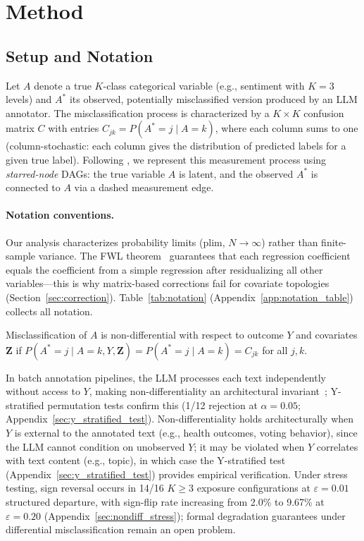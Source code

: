 \section{Method}
\label{sec:method}

\subsection{Setup and Notation}
\label{sec:notation}

Let $A$ denote a true $K$-class categorical variable (e.g., sentiment with $K{=}3$ levels) and $A^*$ its observed, potentially misclassified version produced by an LLM annotator. The misclassification process is characterized by a $K{\times}K$ confusion matrix $C$ with entries $C_{jk} = P(A^*{=}j \mid A{=}k)$, where each column sums to one (column-stochastic: each column gives the distribution of predicted labels for a given true label). Following \citet{hernan_cole2009}, we represent this measurement process using \emph{starred-node} DAGs: the true variable $A$ is latent, and the observed $A^*$ is connected to $A$ via a dashed measurement edge.

\paragraph{Notation conventions.}
Our analysis characterizes probability limits (plim, $N \to \infty$) rather than finite-sample variance. The FWL theorem~\cite{frisch1933partial} guarantees that each regression coefficient equals the coefficient from a simple regression after residualizing all other variables---this is why matrix-based corrections fail for covariate topologies (Section~\ref{sec:correction}). Table~\ref{tab:notation} (Appendix~\ref{app:notation_table}) collects all notation.

\begin{definition}
\label{def:nondiff}
Misclassification of $A$ is non-differential with respect to outcome $Y$ and covariates $\mathbf{Z}$ if $P(A^*{=}j \mid A{=}k, Y, \mathbf{Z}) = P(A^*{=}j \mid A{=}k) = C_{jk}$ for all $j,k$.
\end{definition}

In batch annotation pipelines, the LLM processes each text independently without access to $Y$, making non-differentiality an architectural invariant~\cite{ziems2024can}; Y-stratified permutation tests confirm this (1/12 rejection at $\alpha{=}0.05$; Appendix~\ref{sec:y_stratified_test}). Non-differentiality holds architecturally when $Y$ is external to the annotated text (e.g., health outcomes, voting behavior), since the LLM cannot condition on unobserved $Y$; it may be violated when $Y$ correlates with text content (e.g., topic), in which case the Y-stratified test (Appendix~\ref{sec:y_stratified_test}) provides empirical verification. Under stress testing, sign reversal occurs in 14/16 $K{\geq}3$ exposure configurations at $\varepsilon{=}0.01$ structured departure, with sign-flip rate increasing from 2.0\% to 9.67\% at $\varepsilon{=}0.20$ (Appendix~\ref{sec:nondiff_stress}); formal degradation guarantees under differential misclassification remain an open problem.

